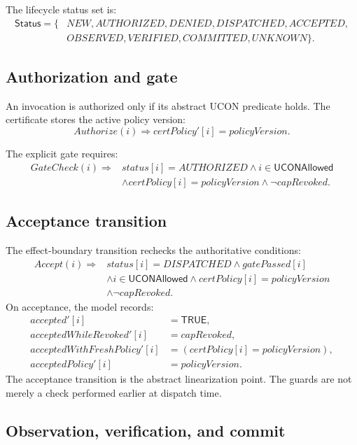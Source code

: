 \documentclass[11pt,a4paper]{article}
\theoremstyle{remark}
\newcommand{\UCONAllowed}{\mathsf{UCONAllowed}}
\newcommand{\UCONStatus}{\mathsf{Status}}
\newcommand{\UCONTrue}{\mathsf{TRUE}}
\begin{document}
The lifecycle status set is:
\[
\begin{split}
\UCONStatus=\{&NEW,AUTHORIZED,DENIED,DISPATCHED,ACCEPTED,\\
&OBSERVED,VERIFIED,COMMITTED,UNKNOWN\}.
\end{split}
\]

\subsection{Authorization and gate}

An invocation is authorized only if its abstract UCON predicate holds. The certificate stores the active policy version:
\[
Authorize(i)\Rightarrow certPolicy'[i]=policyVersion.
\]

The explicit gate requires:
\[
\begin{split}
GateCheck(i)\Rightarrow{}&
status[i]=AUTHORIZED \land i\in\UCONAllowed\\
&\land certPolicy[i]=policyVersion
\land \neg capRevoked.
\end{split}
\]

\subsection{Acceptance transition}

The effect-boundary transition rechecks the authoritative conditions:
\[
\begin{split}
Accept(i)\Rightarrow{}&
status[i]=DISPATCHED \land gatePassed[i]\\
&\land i\in\UCONAllowed
\land certPolicy[i]=policyVersion\\
&\land \neg capRevoked.
\end{split}
\]
On acceptance, the model records:
\[
\begin{split}
accepted'[i]&=\UCONTrue,\\
acceptedWhileRevoked'[i]&=capRevoked,\\
acceptedWithFreshPolicy'[i]&=(certPolicy[i]=policyVersion),\\
acceptedPolicy'[i]&=policyVersion.
\end{split}
\]
The acceptance transition is the abstract linearization point. The guards are not merely a check performed earlier at dispatch time.

\subsection{Observation, verification, and commit}
\end{document}
